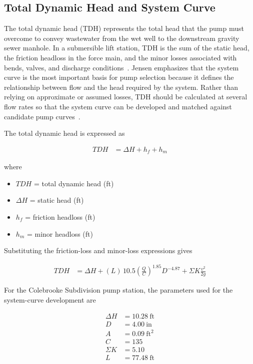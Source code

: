 \subsection{Total Dynamic Head and System Curve}

The total dynamic head (TDH) represents the total head that the pump must overcome to convey wastewater from the wet well to the downstream gravity sewer manhole. In a submersible lift station, TDH is the sum of the static head, the friction headloss in the force main, and the minor losses associated with bends, valves, and discharge conditions~\cite{Jensen_PumpStationDesignGuidelines_2012}. Jensen emphasizes that the system curve is the most important basis for pump selection because it defines the relationship between flow and the head required by the system. Rather than relying on approximate or assumed losses, TDH should be calculated at several flow rates so that the system curve can be developed and matched against candidate pump curves~\cite{Jensen_PumpStationDesignGuidelines_2012}.

The total dynamic head is expressed as

\[
\begin{aligned}
TDH &= \Delta H + h_f + h_m
\end{aligned}
\]

where

\begin{itemize}
\item $TDH$ = total dynamic head (ft)
\item $\Delta H$ = static head (ft)
\item $h_f$ = friction headloss (ft)
\item $h_m$ = minor headloss (ft)
\end{itemize}

Substituting the friction-loss and minor-loss expressions gives

\[
\begin{aligned}
TDH &= \Delta H 
+ (L)\,10.5\left(\frac{Q}{C}\right)^{1.85}D^{-4.87}
+ \Sigma K \frac{v^2}{2g}
\end{aligned}
\]

For the Colebrooke Subdivision pump station, the parameters used for the system-curve development are

\[
\begin{aligned}
\Delta H &= 10.28\ \text{ft} \\
D &= 4.00\ \text{in} \\
A &= 0.09\ \text{ft}^2 \\
C &= 135 \\
\Sigma K &= 5.10 \\
L &= 77.48\ \text{ft}
\end{aligned}
\]

